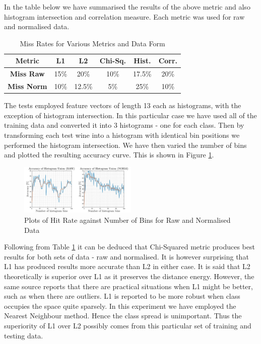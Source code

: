 \documentclass[10pt,twocolumn,letterpaper]{article}
\begin{document}
In the table below we have summarised the results of the above metric and also histogram intersection and correlation measure. Each metric was used for raw and normalised data.

\begin{table}[H]
\caption{Miss Rates for Various Metrics and Data Form \label{tab:MissMetric}}
\small
\begin{center}
\begin{tabular}{|c| c c c c c|}
\hline
\bf Metric & L1 & L2 & Chi-Sq. &  Hist. & Corr. \\ [0.5ex]
\hline
\bf Miss Raw & 15\% &20\%  & 10\% & 17.5\% & 20\% \\ [0.5ex]
\hline
\bf Miss Norm & 10\% & 12.5\% & 5\% & 25\% & 10\% \\ [0.5ex]
\hline
\end{tabular}
\end{center}
\end{table}

\vspace{-5mm}

The tests employed feature vectors of length 13 each as histograms, with the exception of histogram intersection. In this particular case we have used all of the training data and converted it into 3 histograms - one for each class. Then by transforming each test wine into a histogram with identical bin positions we performed the histogram intersection. We have then varied the number of bins and plotted the resulting accuracy curve. This is shown in Figure \ref{fig:hist}.

\begin{figure}[H]
\centering
\includegraphics[width=0.5\textwidth]{../results/Q1D_Hist}
\caption{Plots of Hit Rate against Number of Bins for Raw and Normalised Data
\label{fig:hist}}
\end{figure}

Following from Table \ref{tab:MissMetric} it can be deduced that Chi-Squared metric produces best results for both sets of data - raw and normalised. It is however surprising that L1 has produced results more accurate than L2 in either case. It is said \cite{L1L2} that L2 theoretically is superior over L1 as it preserves the distance energy. However, the same source reports that there are practical situations when L1 might be better, such as when there are outliers. L1 is reported to be more robust when class occupies the space quite sparsely. In this experiment we have employed the Nearest Neighbour method. Hence the class spread is unimportant. Thus the superiority of L1 over L2 possibly comes from this particular set of training and testing data.
\end{document}
